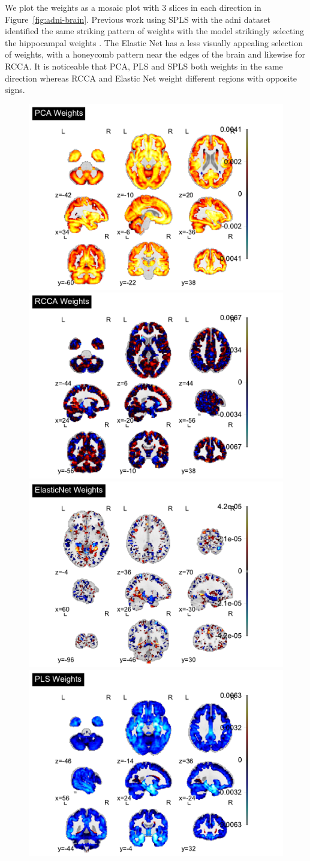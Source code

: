 We plot the \gls{weights} as a mosaic plot with 3 slices in each direction in Figure~\ref{fig:adni-brain}.
Previous work using SPLS with the \acrshort{adni} dataset identified the same striking pattern of \gls{weights} with the model strikingly selecting the hippocampal weights \citep{monteiro2016multiple}.
The Elastic Net has a less visually appealing selection of weights, with a honeycomb pattern near the edges of the brain and likewise for RCCA.
It is noticeable that PCA, PLS and SPLS both \gls{weights} in the same direction whereas RCCA and Elastic Net weight different regions with opposite signs.

\begin{figure}
    \centering
    \includegraphics[width=0.45\linewidth]{figures/adni/PCA brain weights mosaic}
    \includegraphics[width=0.45\linewidth]{figures/adni/RCCA brain weights mosaic}
    \includegraphics[width=0.45\linewidth]{figures/adni/ElasticNet brain weights mosaic}
    \includegraphics[width=0.45\linewidth]{figures/adni/PLS brain weights mosaic}

\end{figure}
